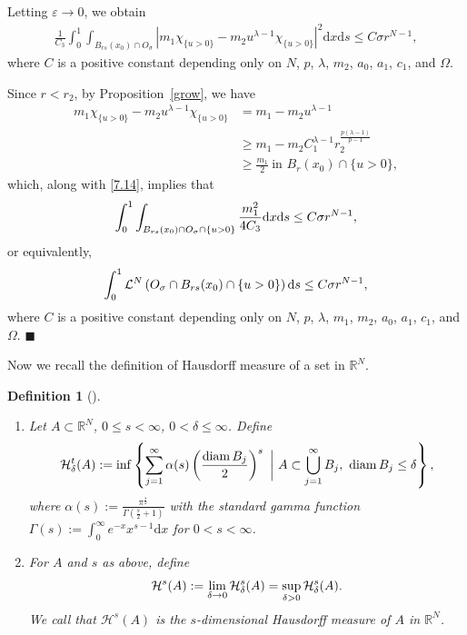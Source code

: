 \documentclass[onecolumn]{autart}
\newtheorem{definition}{Definition}
\newenvironment{proof}{{\it Proof: \enspace}}{\hfill $\blacksquare$\par}
\begin{document}
\begin{proof}
		Letting $\varepsilon \to 0$, we obtain
		\begin{align}\label{7.14}
			\frac{1}{C_3} \int_0^1 \int_{B_{rs}(x_0)\cap O_{\sigma} }  \left| m_1 \chi_{\{u>0\}}  - m_2  u ^{\lambda-1}\chi_{\{u>0\}} \right| ^2 \mathrm{d}x \mathrm{d}s
			\leq  C\sigma r^{N-1},
		\end{align}
		where $C$ is a positive  constant  depending only on $N$, $p$, $\lambda$, $m_2$, $a_0$, $a_1$,   $c_1$,  and $\Omega$.
		
		
		
		Since $r < r_2$, by Proposition~\ref{grow}, we have
		\begin{align*}
			m_1 \chi_{\{u>0\}} - m_2 u^{\lambda-1} \chi_{\{u>0\}}
			&= m_1 - m_2 u^{\lambda-1} \\
			&\ge m_1 - m_2 C_1^{\lambda-1} r_{2}^{\frac{p(\lambda-1)}{p-1}} \\
			&\ge \frac{m_1}{2} \ \text{in } B_{r}(x_0) \cap \{u > 0\},
		\end{align*}
		which, along with \eqref{7.14}, implies that
		\begin{align}
			\int_0^1 \int_{B_{rs}(x_0)\cap O_{\sigma} \cap \{u>0\}}  \frac{m_1^2}{4C_3}\mathrm{d}x \mathrm{d}s \leq  C\sigma r^{N-1},\notag
		\end{align}
		or equivalently,
		\begin{align}
			\int_0^1\mathcal{L}^N \left( O_{\sigma}\cap B_{rs}(x_0)\cap\{u>0\}\right)\mathrm{d}s\leq C\sigma r^{N-1},\notag
		\end{align}
		where $C$ is a positive  constant  depending only on $N$, $p$, $\lambda$, $m_1$, $m_2$, $a_0$,   $a_1$,  $c_1$,  and $\Omega$.
	\end{proof}
	
	
	Now we recall the definition of Hausdorff measure of a set in $\mathbb{R}^N$.
	\begin{definition} [{\cite[p.60]{Evans:2018}}]\label{hadef}
		\begin{enumerate} \item [(i)]Let $ A \subset \mathbb{R}^N $, $ 0 \leq s < \infty $, $ 0 < \delta \leq \infty $. Define
			\begin{align}
				\mathcal{H}_\delta^t(A) := \inf \left\{ \sum_{j=1}^{\infty} \alpha(s) \left( \frac{\operatorname{diam} B_j}{2} \right)^s \ \bigg|\ A \subset \bigcup_{j=1}^{\infty} B_j,\ \operatorname{diam} B_j \leq \delta \right\},\notag
			\end{align}
			where $ \alpha(s) :=\frac{\pi^{\frac{s}{2}}}{\Gamma\left( \frac{s}{2} + 1 \right)}$ with the standard gamma function $  \Gamma (s) := \int_0^\infty e^{-x} x^{s-1} \mathrm{d}x $ for $   0<s <  \infty $.
			\item [(i)]For $ A $ and $ s $ as above, define
			\begin{align}
				\mathcal{H}^s(A) := \lim_{\delta \to 0} \mathcal{H}_\delta^s(A) = \sup_{\delta > 0} \mathcal{H}_\delta^s(A).\notag
			\end{align}
			We call that $ \mathcal{H}^s (A)$ is the $ s $-dimensional Hausdorff measure of $A$ in $ \mathbb{R}^N $.
		\end{enumerate}
	\end{definition}
	
\end{document}
